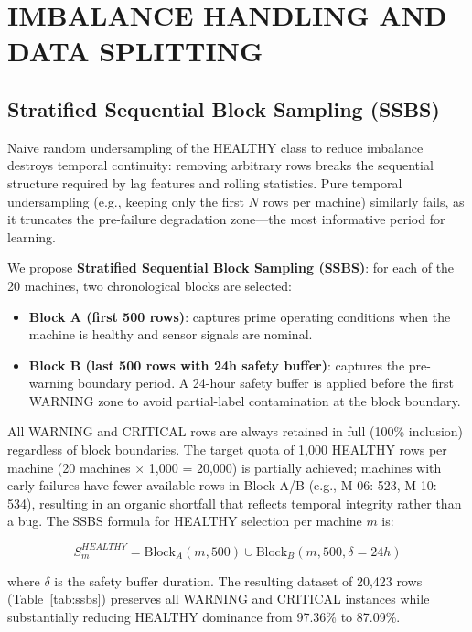 \documentclass[conference]{IEEEtran}
\begin{document}
\section{IMBALANCE HANDLING AND DATA SPLITTING}

\subsection{Stratified Sequential Block Sampling (SSBS)}

Naive random undersampling of the HEALTHY class to reduce imbalance destroys temporal continuity: removing arbitrary rows breaks the sequential structure required by lag features and rolling statistics. Pure temporal undersampling (e.g., keeping only the first $N$ rows per machine) similarly fails, as it truncates the pre-failure degradation zone—the most informative period for learning.

We propose \textbf{Stratified Sequential Block Sampling (SSBS)}: for each of the 20 machines, two chronological blocks are selected:
\begin{itemize}
\item \textbf{Block A (first 500 rows)}: captures prime operating conditions when the machine is healthy and sensor signals are nominal.
\item \textbf{Block B (last 500 rows with 24h safety buffer)}: captures the pre-warning boundary period. A 24-hour safety buffer is applied before the first WARNING zone to avoid partial-label contamination at the block boundary.
\end{itemize}

All WARNING and CRITICAL rows are always retained in full (100\% inclusion) regardless of block boundaries. The target quota of 1,000 HEALTHY rows per machine (20 machines $\times$ 1,000 = 20,000) is partially achieved; machines with early failures have fewer available rows in Block A/B (e.g., M-06: 523, M-10: 534), resulting in an organic shortfall that reflects temporal integrity rather than a bug. The SSBS formula for HEALTHY selection per machine $m$ is:

\begin{equation}
S_m^{HEALTHY} = \text{Block}_A(m, 500) \cup \text{Block}_B(m, 500, \delta=24h)
\label{eq:ssbs}
\end{equation}

where $\delta$ is the safety buffer duration. The resulting dataset of 20,423 rows (Table~\ref{tab:ssbs}) preserves all WARNING and CRITICAL instances while substantially reducing HEALTHY dominance from 97.36\% to 87.09\%.
\end{document}
